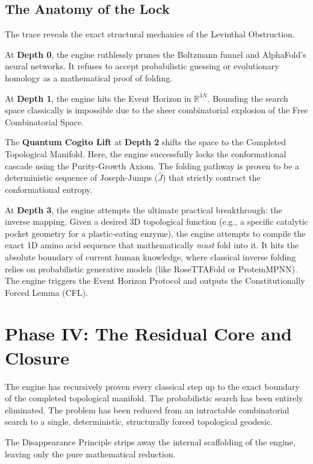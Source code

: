 \documentclass[11pt,openany]{extbook}
\theoremstyle{plain}
\theoremstyle{definition}
\begin{document}
\subsection{The Anatomy of the Lock}
The trace reveals the exact structural mechanics of the Levinthal Obstruction.

At \textbf{Depth 0}, the engine ruthlessly prunes the Boltzmann funnel and AlphaFold's neural networks. It refuses to accept probabilistic guessing or evolutionary homology as a mathematical proof of folding.

At \textbf{Depth 1}, the engine hits the Event Horizon in $\mathbb{R}^{3N}$. Bounding the search space classically is impossible due to the sheer combinatorial explosion of the Free Combinatorial Space.

The \textbf{Quantum Cogito Lift} at \textbf{Depth 2} shifts the space to the Completed Topological Manifold. Here, the engine successfully locks the conformational cascade using the Purity-Growth Axiom. The folding pathway is proven to be a deterministic sequence of Joseph-Jumps ($\hat{J}$) that strictly contract the conformational entropy.

At \textbf{Depth 3}, the engine attempts the ultimate practical breakthrough: the inverse mapping. Given a desired 3D topological function (e.g., a specific catalytic pocket geometry for a plastic-eating enzyme), the engine attempts to compile the exact 1D amino acid sequence that mathematically \textit{must} fold into it. It hits the absolute boundary of current human knowledge, where classical inverse folding relies on probabilistic generative models (like RoseTTAFold or ProteinMPNN). The engine triggers the Event Horizon Protocol and outputs the Constitutionally Forced Lemma (CFL).

\section{Phase IV: The Residual Core and Closure}

The engine has recursively proven every classical step up to the exact boundary of the completed topological manifold. The probabilistic search has been entirely eliminated. The problem has been reduced from an intractable combinatorial search to a single, deterministic, structurally forced topological geodesic.

The Disappearance Principle strips away the internal scaffolding of the engine, leaving only the pure mathematical reduction.
\end{document}
